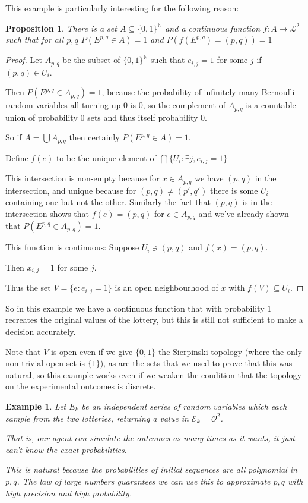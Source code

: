 \documentclass[a4paper]{book}
\newtheorem{proposition}{Proposition}[section]
\newtheorem{example}{Example}[section]
\begin{document}
This example is particularly interesting for the following reason:

\begin{proposition}
There is a set $A \subseteq \{0, 1\}^{\mathbb{N}}$
and a continuous function $f: A \to \mathcal{L}^2$
such that for all $p, q$
$P(E^{p, q} \in A) = 1$
and $P(f(E^{p, q}) = (p, q)) = 1$
\end{proposition}

\begin{proof}
Let $A_{p, q}$
be the subset of $\{0, 1\}^{\mathbb{N}}$
such that $e_{i, j} = 1$
for some $j$
if $(p, q) \in U_i$.

Then $P(E^{p, q} \in A_{p, q}) = 1$,
because the probability of infinitely many Bernoulli random variables all
turning up $0$
is $0$,
so the complement of $A_{p, q}$
is a countable union of probability $0$
sets and thus itself probability $0$.

So if $A = \bigcup A_{p, q}$
then certainly $P(E^{p, q} \in A) = 1$.

Define $f(e)$
to be the unique element of $\bigcap \{U_i: \exists j, e_{i, j} = 1\}$

This intersection is non-empty because for \(x \in A_{p, q}\)
we have $(p, q)$
in the intersection, and unique because for $(p, q) \neq (p', q')$
there is some $U_i$
containing one but not the other. Similarly the fact that $(p, q)$
is in the intersection shows that $f(e) = (p, q)$
for $e \in A_{p, q}$
and we've already shown that $P(E^{p, q} \in A_{p, q}) = 1$.

This function  is continuous: Suppose $U_i \ni (p, q)$
and $f(x) = (p, q)$.

Then $x_{i, j} = 1$
for some $j$.

Thus the set $V = \{e: e_{i, j} = 1\}$
is an open neighbourhood of $x$
with $f(V) \subseteq U_i$.
\end{proof}

So in this example we have a continuous function that with probability $1$
recreates the original values of the lottery, but this is still not
sufficient to make a decision accurately.

Note that $V$ is open even if we give $\{0, 1\}$
the Sierpinski topology (where the only non-trivial open set
is $\{1\}$),
as are the sets that we used to prove that this was natural,
so this example works even if we weaken the condition that
the topology on the experimental outcomes is discrete.

\begin{example}
Let $E_k$ be an independent series of random variables which each sample from the two
lotteries, returning a value in $\mathcal{E}_k = \mathcal{O}^2$.

That is, our agent can simulate
the outcomes as many times as it wants, it just can't know the exact probabilities.

This is natural because the probabilities of initial sequences are all
polynomial in $p, q$.
The law of large numbers guarantees we can use this to approximate $p, q$
with high precision and high probability.
\end{example}
\end{document}
